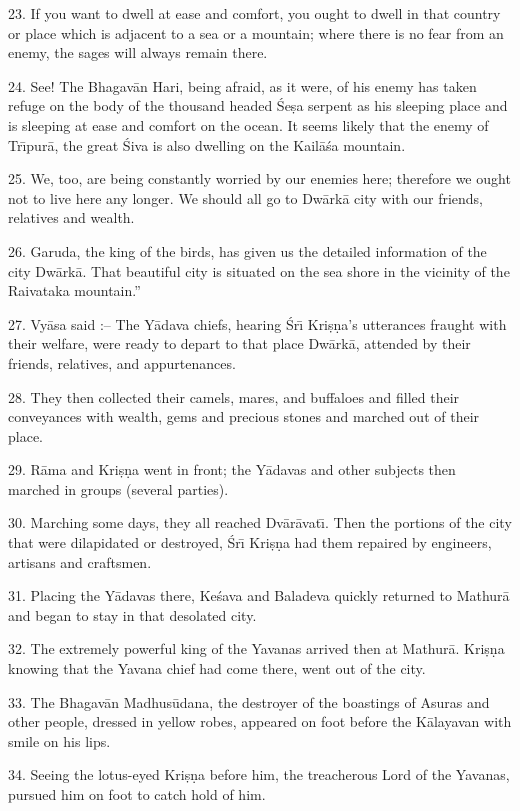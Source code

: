 23. If you want to dwell at ease and comfort, you ought to dwell in that country or place which is adjacent to a sea or a mountain; where there is no fear from an enemy, the sages will always remain there.

24. See! The Bhagav\=an Hari, being afraid, as it were, of his enemy has taken refuge on the body of the thousand headed \'Se\d{s}a serpent as his sleeping place and is sleeping at ease and comfort on the ocean. It seems likely that the enemy of Tr\={\i}pur\=a, the great \'Siva is also dwelling on the Kail\=a\'sa mountain.

25. We, too, are being constantly worried by our enemies here; therefore we ought not to live here any longer. We should all go to Dw\=ark\=a city with our friends, relatives and wealth.

26. Garuda, the king of the birds, has given us the detailed information of the city Dw\=ark\=a. That beautiful city is situated on the sea shore in the vicinity of the Raivataka mountain.''

27. Vy\=asa said :-- The Y\=adava chiefs, hearing \'Sr\={\i} Kri\d{s}\d{n}a's utterances fraught with their welfare, were ready to depart to that place Dw\=ark\=a, attended by their friends, relatives, and appurtenances.

28. They then collected their camels, mares, and buffaloes and filled their conveyances with wealth, gems and precious stones and marched out of their place.

29. R\=ama and Kri\d{s}\d{n}a went in front; the Y\=adavas and other subjects then marched in groups (several parties).

30. Marching some days, they all reached Dv\=ar\=avat\={\i}. Then the portions of the city that were dilapidated or destroyed, \'Sr\={\i} Kri\d{s}\d{n}a had them repaired by engineers, artisans and craftsmen.

31. Placing the Y\=adavas there, Ke\'sava and Baladeva quickly returned to Mathur\=a and began to stay in that desolated city.

32. The extremely powerful king of the Yavanas arrived then at Mathur\=a. Kri\d{s}\d{n}a knowing that the Yavana chief had come there, went out of the city.

33. The Bhagav\=an Madhus\=udana, the destroyer of the boastings of Asuras and other people, dressed in yellow robes, appeared on foot before the K\=alayavan with smile on his lips.

34. Seeing the lotus-eyed Kri\d{s}\d{n}a before him, the treacherous Lord of the Yavanas, pursued him on foot to catch hold of him.

